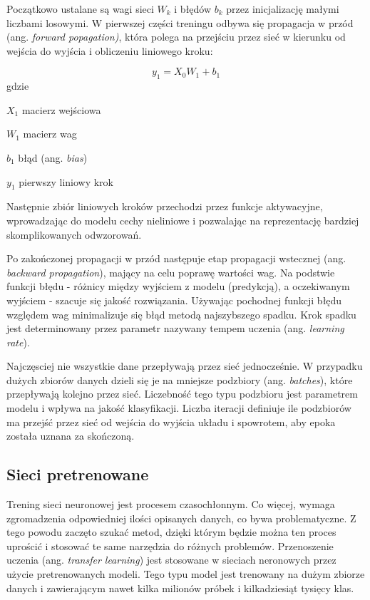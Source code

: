 Początkowo ustalane są wagi sieci $W_k$ i błędów $b_k$ przez inicjalizację małymi liczbami losowymi. W pierwszej części treningu odbywa się propagacja w przód (ang. \textit{forward popagation)}, która polega na przejściu przez sieć w kierunku od wejścia do wyjścia i obliczeniu liniowego kroku:

\begin{equation}
y_1 = X_0 W_1 + b_1
\end{equation}
gdzie
\begin{eqwhere}[2cm]
	\item[$X_1$] macierz wejściowa
	\item[$W_1$] macierz wag
	\item[$b_1$] błąd (ang. \textit{bias})
	\item[$y_1$] pierwszy liniowy krok
\end{eqwhere}

Następnie zbiór liniowych kroków przechodzi przez funkcje aktywacyjne, wprowadzając do modelu cechy nieliniowe i pozwalając na reprezentację bardziej skomplikowanych odwzorowań.

Po zakończonej propagacji w przód następuje etap propagacji wstecznej (ang. \textit{backward propagation}), mający na celu poprawę wartości wag. Na podstwie funkcji błędu - różnicy między wyjściem z modelu (predykcją), a oczekiwanym wyjściem - szacuje się jakość rozwiązania. Używając pochodnej funkcji błędu względem wag minimalizuje się błąd metodą najszybszego spadku. Krok spadku jest determinowany przez parametr nazywany tempem uczenia (ang. \textit{learning rate}). 

Najczęsciej nie wszystkie dane przepływają przez sieć jednocześnie. W przypadku dużych zbiorów danych dzieli się je na mniejsze podzbiory (ang. \textit{batches}), które przepływają kolejno przez sieć. Liczebność tego typu podzbioru jest parametrem modelu i wpływa na jakość klasyfikacji. Liczba iteracji definiuje ile podzbiorów ma przejść przez sieć od wejścia do wyjścia układu i spowrotem, aby epoka została uznana za skończoną. 

\subsection{Sieci pretrenowane}

Trening sieci neuronowej jest procesem czasochłonnym. Co więcej, wymaga zgromadzenia odpowiedniej ilości opisanych danych, co bywa problematyczne. Z tego powodu zaczęto szukać metod, dzięki którym będzie można ten proces uprościć i stosować te same narzędzia do różnych problemów. Przenoszenie uczenia (ang. \textit{transfer learning}) jest stosowane w sieciach neronowych przez użycie pretrenowanych modeli. Tego typu model jest trenowany na dużym zbiorze danych i zawierającym nawet kilka milionów próbek i kilkadziesiąt tysięcy klas. 

